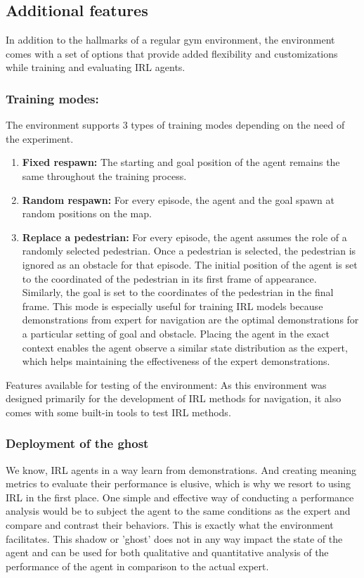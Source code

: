 \subsection*{Additional features}
In addition to the hallmarks of a regular gym environment, the environment comes with a set of options that provide added flexibility and customizations while training and evaluating IRL agents.
\subsubsection*{Training modes:}
The environment supports 3 types of training modes depending on the need of the experiment. 
\begin{enumerate}
	\item \textbf{Fixed respawn:} The starting and goal position of the agent remains the same throughout the training process.
	\item \textbf{Random respawn:} For every episode, the agent and the goal spawn at random positions on the map. 
	\item \textbf{Replace a pedestrian:} For every episode, the agent assumes the role of a randomly selected pedestrian. Once a pedestrian is selected, the pedestrian is ignored as an obstacle for that episode. The initial position of the agent is set to the coordinated of the pedestrian in its first frame of appearance. Similarly, the goal is set to the coordinates of the pedestrian in the final frame.
	This mode is especially useful for training IRL models because demonstrations from expert for navigation are the optimal demonstrations for a particular setting of goal and obstacle. Placing the agent in the exact context enables the agent observe a similar state distribution as the expert, which helps maintaining the effectiveness of the expert demonstrations. 
\end{enumerate}

Features available for testing of the environment:
As this environment was designed primarily for the development of IRL methods for navigation, it also comes with some built-in tools to test IRL methods.
\subsubsection*{Deployment of the ghost}
We know, IRL agents in a way learn from demonstrations. And creating meaning metrics to evaluate their performance is elusive, which is why we resort to using IRL in the first place. One simple and effective way of conducting a performance analysis would be to subject the agent to the same conditions as the expert and compare and contrast their behaviors. This is exactly what the environment facilitates. This shadow or 'ghost' does not in any way impact the state of the agent and can be used for both qualitative and quantitative analysis of the performance of the agent in comparison to the actual expert. 

